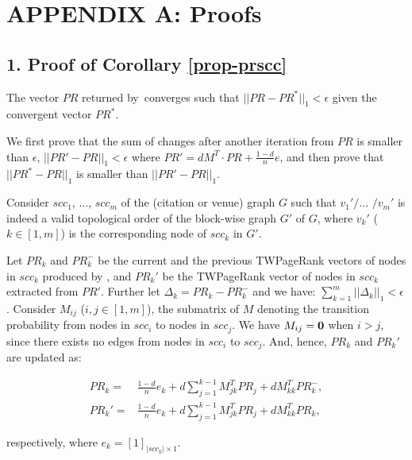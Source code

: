 \newpage
\clearpage

\section*{APPENDIX A: Proofs}
\label{sec-proof}


\subsection*{1. Proof of Corollary \ref{prop-prscc}}
The vector $PR$ returned by~\twprscc converges such that $||PR-PR^*||_1 < \epsilon$ given the convergent vector $PR^*$.

\vspace{.5ex}
\begin{proofS}
We first prove that the sum of changes after another iteration from $PR$ is smaller than $\epsilon$, \ie $||PR'-PR||_1 < \epsilon$ where $PR'=d M^T\cdot PR + \frac{1-d}{n} e$, and then prove that $||PR^*-PR||_1$ is smaller than $||PR'-PR||_1$.

Consider $scc_1$, $\dots$, $scc_m$ of the (citation or venue) graph $G$ such that $v_1'/\dots$ $/v_m'$ is indeed a valid topological order of the block-wise graph $G'$ of $G$, where %
$v_k'$ ($k\in [1,m]$) is the corresponding node of $scc_k$ in $G'$.

Let $PR_k$ and $PR_k^-$ be the current and the previous TWPageRank vectors of nodes in $scc_k$ produced
by \twprscc, and $PR_k'$ be the TWPageRank vector of nodes in $scc_k$ extracted from $PR'$.
Further let $\Delta_k=PR_k-PR^-_k$ and we have:
$\sum_{k=1}^m ||\Delta_k||_1 < \epsilon$.
%
Consider $M_{ij}$ ($i,j\in[1,m]$), the submatrix of $M$ denoting the transition probability from nodes in $scc_i$ to nodes in $scc_j$. We have $M_{ij}=\bf{0}$ when $i>j$, since there exists no edges from nodes in $scc_i$ to $scc_j$. And, hence, $PR_k$ and $PR_k'$ are updated as:

\vspace{-1ex}
\begin{small}
\begin{equation*}
\begin{split}
PR_k=&\frac{1-d}{n} e_k+ d \sum_{j=1}^{k-1} M_{jk}^T PR_j + d M_{kk}^T PR_k^-,\\
PR_k'=&\frac{1-d}{n}  e_k+ d \sum_{j=1}^{k-1} M_{jk}^T PR_j + d M_{kk}^T PR_k,
\end{split}
\end{equation*}
\end{small}
\noindent
respectively, where $e_k=[1]_{|scc_k|\times 1}$.



\end{proofS}

